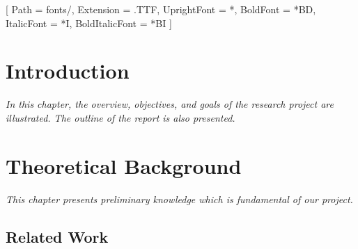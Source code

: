 \documentclass[12pt]{report}
\begin{document}



\setmainfont{TIMES}[
    Path = fonts/,
    Extension = .TTF,
    UprightFont = *,
    BoldFont = *BD,
    ItalicFont = *I,
    BoldItalicFont = *BI
]











\renewcommand*{\glossaryname}{Table of Glossary}
\printglossaries





\listoftables
\newpage

\listoffigures
\newpage


\chapter{Introduction}

\textit{In this chapter, the overview, objectives, and goals of the research project are illustrated. The outline of the report is also presented.}











\chapter{Theoretical Background}
\textit{This chapter presents preliminary knowledge which is fundamental of our project.}


\section{Related Work}
\label{sec:related_work}



\end{document}
